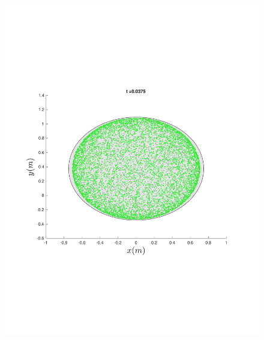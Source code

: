 \begin{figure}
{\begin{minipage}{0.5\textwidth}
\begin{minipage}[b]{0.5\textwidth}
        \includegraphics[width=\textwidth]{figures/method/FunnelSimOverlaid6funnel-1}
      \end{minipage}%
      \begin{minipage}[b]{0.5\textwidth}

\end{minipage}
\end{minipage}}
\end{figure}
